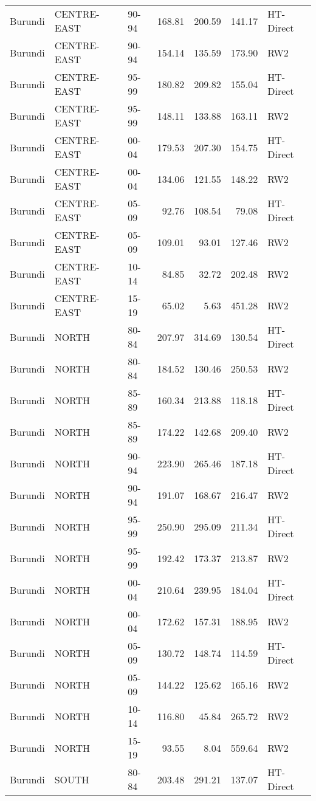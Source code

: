 \begin{longtable}{lllrrrl}
  Burundi & CENTRE-EAST & 90-94 & 168.81 & 200.59 & 141.17 & HT-Direct \\ 
  Burundi & CENTRE-EAST & 90-94 & 154.14 & 135.59 & 173.90 & RW2 \\ 
  Burundi & CENTRE-EAST & 95-99 & 180.82 & 209.82 & 155.04 & HT-Direct \\ 
  Burundi & CENTRE-EAST & 95-99 & 148.11 & 133.88 & 163.11 & RW2 \\ 
  Burundi & CENTRE-EAST & 00-04 & 179.53 & 207.30 & 154.75 & HT-Direct \\ 
  Burundi & CENTRE-EAST & 00-04 & 134.06 & 121.55 & 148.22 & RW2 \\ 
  Burundi & CENTRE-EAST & 05-09 & 92.76 & 108.54 & 79.08 & HT-Direct \\ 
  Burundi & CENTRE-EAST & 05-09 & 109.01 & 93.01 & 127.46 & RW2 \\ 
  Burundi & CENTRE-EAST & 10-14 & 84.85 & 32.72 & 202.48 & RW2 \\ 
  Burundi & CENTRE-EAST & 15-19 & 65.02 & 5.63 & 451.28 & RW2 \\ 
  Burundi & NORTH & 80-84 & 207.97 & 314.69 & 130.54 & HT-Direct \\ 
  Burundi & NORTH & 80-84 & 184.52 & 130.46 & 250.53 & RW2 \\ 
  Burundi & NORTH & 85-89 & 160.34 & 213.88 & 118.18 & HT-Direct \\ 
  Burundi & NORTH & 85-89 & 174.22 & 142.68 & 209.40 & RW2 \\ 
  Burundi & NORTH & 90-94 & 223.90 & 265.46 & 187.18 & HT-Direct \\ 
  Burundi & NORTH & 90-94 & 191.07 & 168.67 & 216.47 & RW2 \\ 
  Burundi & NORTH & 95-99 & 250.90 & 295.09 & 211.34 & HT-Direct \\ 
  Burundi & NORTH & 95-99 & 192.42 & 173.37 & 213.87 & RW2 \\ 
  Burundi & NORTH & 00-04 & 210.64 & 239.95 & 184.04 & HT-Direct \\ 
  Burundi & NORTH & 00-04 & 172.62 & 157.31 & 188.95 & RW2 \\ 
  Burundi & NORTH & 05-09 & 130.72 & 148.74 & 114.59 & HT-Direct \\ 
  Burundi & NORTH & 05-09 & 144.22 & 125.62 & 165.16 & RW2 \\ 
  Burundi & NORTH & 10-14 & 116.80 & 45.84 & 265.72 & RW2 \\ 
  Burundi & NORTH & 15-19 & 93.55 & 8.04 & 559.64 & RW2 \\ 
  Burundi & SOUTH & 80-84 & 203.48 & 291.21 & 137.07 & HT-Direct \\ 

\end{longtable}
